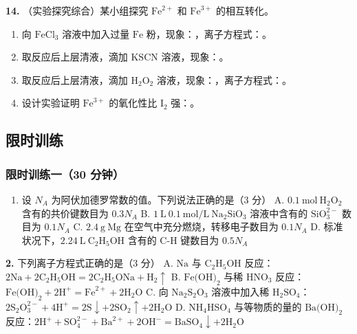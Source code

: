 \textbf{14.} （实验探究综合）某小组探究 $\text{Fe}^{2+}$ 和 $\text{Fe}^{3+}$ 的相互转化。

\begin{enumerate}
  \item 向 $\text{FeCl}_3$ 溶液中加入过量 $\text{Fe}$ 粉，现象：\underline{\qquad\qquad}，离子方程式：\underline{\qquad\qquad}。
  \item 取反应后上层清液，滴加 $\text{KSCN}$ 溶液，现象：\underline{\qquad\qquad}。
  \item 取反应后上层清液，滴加 $\text{H}_2\text{O}_2$ 溶液，现象：\underline{\qquad\qquad}，离子方程式：\underline{\qquad\qquad}。
  \item 设计实验证明 $\text{Fe}^{3+}$ 的氧化性比 $\text{I}_2$ 强：\underline{\qquad\qquad}。
\end{enumerate}

\subsection{限时训练}

\subsubsection{限时训练一（30 分钟）}

\begin{enumerate}
  \item 设 $N_A$ 为阿伏加德罗常数的值。下列说法正确的是（3 分）
  A. $0.1\ \text{mol}\ \text{H}_2\text{O}_2$ 含有的共价键数目为 $0.3N_A$
  B. $1\ \text{L}\ 0.1\ \text{mol/L}\ \text{Na}_2\text{SiO}_3$ 溶液中含有的 $\text{SiO}_3^{2-}$ 数目为 $0.1N_A$
  C. $2.4\ \text{g}\ \text{Mg}$ 在空气中充分燃烧，转移电子数目为 $0.1N_A$
  D. 标准状况下，$2.24\ \text{L}\ \text{C}_2\text{H}_5\text{OH}$ 含有的 $\text{C-H}$ 键数目为 $0.5N_A$
  \end{enumerate}

  \textbf{2.} 下列离子方程式正确的是（3 分）
  A. $\text{Na}$ 与 $\text{C}_2\text{H}_5\text{OH}$ 反应：$2\text{Na} + 2\text{C}_2\text{H}_5\text{OH} = 2\text{C}_2\text{H}_5\text{ONa} + \text{H}_2\uparrow$
  B. $\text{Fe(OH)}_2$ 与稀 $\text{HNO}_3$ 反应：$\text{Fe(OH)}_2 + 2\text{H}^+ = \text{Fe}^{2+} + 2\text{H}_2\text{O}$
  C. 向 $\text{Na}_2\text{S}_2\text{O}_3$ 溶液中加入稀 $\text{H}_2\text{SO}_4$：$2\text{S}_2\text{O}_3^{2-} + 4\text{H}^+ = 2\text{S}\downarrow + 2\text{SO}_2\uparrow + 2\text{H}_2\text{O}$
  D. $\text{NH}_4\text{HSO}_4$ 与等物质的量的 $\text{Ba(OH)}_2$ 反应：$2\text{H}^+ + \text{SO}_4^{2-} + \text{Ba}^{2+} + 2\text{OH}^- = \text{BaSO}_4\downarrow + 2\text{H}_2\text{O}$

